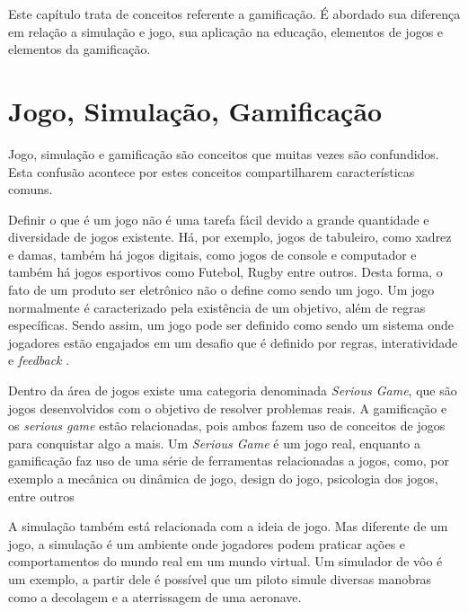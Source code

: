 \documentclass[
	12pt,				%
	oneside,			%
	a4paper,			%
	english,			%
	french,				%
	spanish,			%
	brazil,				%
	]{abntex2}
\begin{document}
Este capítulo trata de conceitos referente a gamificação. É abordado sua diferença em relação a simulação e jogo, sua aplicação na educação, elementos de jogos e elementos da gamificação.

\section{Jogo, Simulação, Gamificação}

Jogo, simulação e gamificação são conceitos que muitas vezes são confundidos. Esta confusão acontece por estes conceitos compartilharem características comuns.

Definir o que é um jogo não é uma tarefa fácil devido a grande quantidade e diversidade de jogos existente. Há, por exemplo, jogos de tabuleiro, como xadrez e damas, também há jogos digitais, como jogos de console e computador e também há jogos esportivos como Futebol, Rugby entre outros. Desta forma, o fato de um produto ser eletrônico não o define como sendo um jogo. Um jogo normalmente é caracterizado pela existência de um objetivo, além de regras específicas. Sendo assim, um jogo pode ser definido como sendo um sistema onde jogadores estão engajados em um desafio que é definido por regras, interatividade e \textit{feedback} \cite{kaap:2014}. 

Dentro da área de jogos existe uma categoria denominada \textit{Serious Game}, que são jogos desenvolvidos com o objetivo de resolver problemas reais. A gamificação e os \textit{serious game} estão relacionadas, pois ambos fazem uso de conceitos de jogos para conquistar algo a mais. Um \textit{Serious Game} é um jogo real, enquanto a gamificação faz uso de uma série de ferramentas relacionadas a jogos, como, por exemplo a mecânica ou dinâmica de jogo, design do jogo, psicologia dos jogos, entre outros \cite{dorling2012software}

A simulação também está relacionada com a ideia de jogo. Mas diferente de um jogo, a simulação é um ambiente onde jogadores podem praticar ações e comportamentos do mundo real em um mundo virtual. Um simulador de vôo é um exemplo, a partir dele é possível que um piloto simule diversas manobras como a decolagem e a aterrissagem de uma aeronave.
\end{document}
